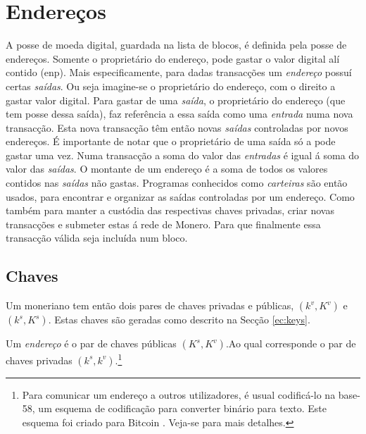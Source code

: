 \chapter{Endereços}
\label{chapter:addresses}

A posse de moeda digital, guardada na lista de blocos, é definida pela posse de endereços. Somente o proprietário do endereço, pode gastar o valor digital alí contido (enp).
Mais especificamente, para dadas transacções um {\em endereço} possuí certas {\em saídas}.
Ou seja imagine-se o proprietário do endereço, com o direito a gastar valor digital.
Para gastar de uma {\em saída}, o proprietário do endereço (que tem posse dessa saída), faz referência a essa saída como uma {\em entrada} numa nova transacção.
Esta nova transacção têm então novas {\em saídas} controladas por novos endereços.
É importante de notar que o proprietário de uma saída só a pode gastar uma vez.
Numa transacção a soma do valor das {\em entradas} é igual á soma do valor das {\em saídas}. O montante de um endereço é a soma de todos os valores contidos nas {\em saídas} não gastas.
Programas conhecidos como {\em carteiras} são então usados, para encontrar e organizar as saídas controladas por um endereço. Como também para manter a custódia das respectivas chaves privadas, criar novas transacções e submeter estas á rede de Monero. Para que finalmente essa transacção válida seja incluída num bloco.

\section{Chaves}
\label{sec:user-keys}

Um moneriano tem então dois pares de chaves privadas e públicas, \((k^v, K^v)\) e \( (k^s, K^s) \). Estas chaves são geradas como descrito na Secção \ref{ec:keys}.

Um {\em endereço} é o par de chaves públicas \((K^s, K^v)\).\newline Ao qual corresponde o par de chaves privadas \((k^s, k^v)\).\footnote{Para comunicar um endereço a outros utilizadores, é usual codificá-lo na base-58, um esquema de codificação para converter binário para texto. Este esquema foi criado para Bitcoin \cite{base-58-encoding}. Veja-se \cite{luigi-address} para mais detalhes.}

